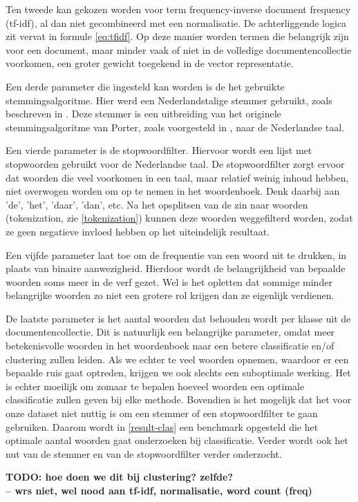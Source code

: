 Ten tweede kan gekozen worden voor term frequency-inverse document frequency (tf-idf), al dan niet gecombineerd met een normalisatie. De achterliggende logica zit vervat in formule \ref{eq:tfidf}. Op deze manier worden termen die belangrijk zijn voor een document, maar minder vaak of niet in de volledige documentencollectie voorkomen, een groter gewicht toegekend in de vector representatie. 

Een derde parameter die ingesteld kan worden is de het gebruikte stemmingsalgoritme. Hier werd een Nederlandstalige stemmer gebruikt, zoals beschreven in \cite{Kraaij1994}. Deze stemmer is een uitbreiding van het originele stemmingsalgoritme van Porter, zoals voorgesteld in \cite{Porter1980}, naar de Nederlandse taal. 

Een vierde parameter is de stopwoordfilter. Hiervoor wordt een lijst met stopwoorden gebruikt voor de Nederlandse taal. De stopwoordfilter zorgt ervoor dat woorden die veel voorkomen in een taal, maar relatief weinig inhoud hebben, niet overwogen worden om op te nemen in het woordenboek. Denk daarbij aan 'de', 'het', 'daar', 'dan', etc. Na het opsplitsen van de zin naar woorden (tokenization, zie \ref{tokenization}) kunnen deze woorden weggefilterd worden, zodat ze geen negatieve invloed hebben op het uiteindelijk resultaat.

Een vijfde parameter laat toe om de frequentie van een woord uit te drukken, in plaats van binaire aanwezigheid. Hierdoor wordt de belangrijkheid van bepaalde woorden soms meer in de verf gezet. Wel is het opletten dat sommige minder belangrijke woorden zo niet een grotere rol krijgen dan ze eigenlijk verdienen.

De laatste parameter is het aantal woorden dat behouden wordt per klasse uit de documentencollectie. Dit is natuurlijk een belangrijke parameter, omdat meer betekenisvolle woorden in het woordenboek naar een betere classificatie en/of clustering zullen leiden. Als we echter te veel woorden opnemen, waardoor er een bepaalde ruis gaat optreden, krijgen we ook slechts een suboptimale werking. Het is echter moeilijk om zomaar te bepalen hoeveel woorden een optimale classificatie zullen geven bij elke methode. Bovendien is het mogelijk dat het voor onze dataset niet nuttig is om een stemmer of een stopwoordfilter te gaan gebruiken. Daarom wordt in \ref{result-clas} een benchmark opgesteld die het optimale aantal woorden gaat onderzoeken bij classificatie. Verder wordt ook het  nut van de stemmer en van de stopwoordfilter verder onderzocht. 

\textbf{TODO: hoe doen we dit bij clustering? zelfde?\\-- wrs niet, wel nood aan tf-idf, normalisatie, word count (freq)}
\fi


